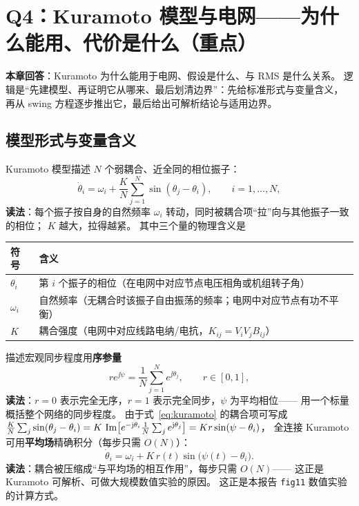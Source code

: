 \section{Q4：Kuramoto 模型与电网——为什么能用、代价是什么（重点）}
\label{sec:q4}

\noindent\textbf{本章回答}：Kuramoto 为什么能用于电网、假设是什么、与 RMS 是什么关系。
逻辑是“先建模型、再证明它从哪来、最后划清边界”：先给标准形式与变量含义，
再从 swing 方程逐步推出它，最后给出可解析结论与适用边界。

\subsection{模型形式与变量含义}

Kuramoto 模型描述 $N$ 个弱耦合、近全同的相位振子\cite{kuramoto1984}：
\begin{equation}
\dot\theta_i=\omega_i+\frac{K}{N}\sum_{j=1}^{N}\sin(\theta_j-\theta_i),
\qquad i=1,\dots,N,
\label{eq:kuramoto}
\end{equation}
\textbf{读法}：每个振子按自身的自然频率 $\omega_i$ 转动，同时被耦合项“拉”向与其他振子一致的相位；
$K$ 越大，拉得越紧。
其中三个量的物理含义是
\begin{center}
\begin{tabular}{@{}ll@{}}
\toprule
符号 & 含义 \\
\midrule
$\theta_i$ & 第 $i$ 个振子的相位（在电网中对应节点电压相角或机组转子角） \\
$\omega_i$ & 自然频率（无耦合时该振子自由振荡的频率；电网中对应节点有功不平衡） \\
$K$ & 耦合强度（电网中对应线路电纳/电抗，$K_{ij}=V_iV_jB_{ij}$） \\
\bottomrule
\end{tabular}
\end{center}
描述宏观同步程度用\textbf{序参量}
\begin{equation}
r e^{\jj\psi}=\frac{1}{N}\sum_{j=1}^{N}e^{\jj\theta_j},\qquad r\in[0,1],
\label{eq:order-param}
\end{equation}
\textbf{读法}：$r=0$ 表示完全无序，$r=1$ 表示完全同步，$\psi$ 为平均相位——
用一个标量概括整个网络的同步程度。
由于式~\eqref{eq:kuramoto} 的耦合项可写成
$\frac{K}{N}\sum_j\sin(\theta_j-\theta_i)
=K\,\operatorname{Im}\bigl[e^{-\mathrm{j}\theta_i}\frac{1}{N}\sum_j e^{\mathrm{j}\theta_j}\bigr]
=K r\sin(\psi-\theta_i)$，
全连接 Kuramoto 可用\textbf{平均场}精确积分（每步只需 $O(N)$）：
\begin{equation}
\dot\theta_i=\omega_i+K\,r(t)\sin\bigl(\psi(t)-\theta_i\bigr).
\label{eq:kuramoto-meanfield}
\end{equation}
\textbf{读法}：耦合被压缩成“与平均场的相互作用”，每步只需 $O(N)$——
这正是 Kuramoto 可解析、可做大规模数值实验的原因。
这正是本报告 \texttt{fig11} 数值实验的计算方式。

